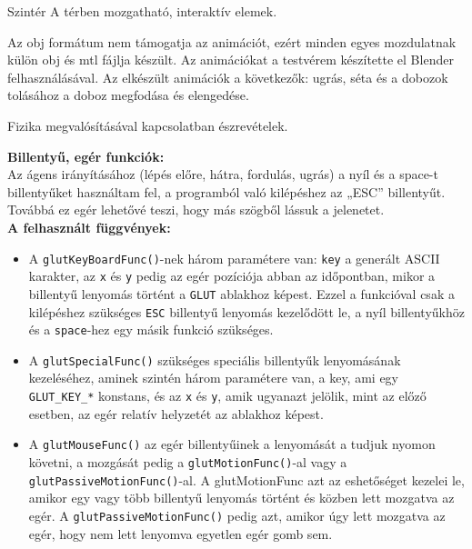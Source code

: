 
Szintér
A térben mozgatható, interaktív elemek.

Az obj formátum nem támogatja az animációt, ezért minden egyes mozdulatnak külön obj és mtl fájlja készült.
Az animációkat a testvérem készítette el Blender felhasználásával. Az elkészült animációk a következők:
ugrás, séta és a dobozok tolásához a doboz megfodása és elengedése.
 
Fizika megvalósításával kapcsolatban észrevételek.


{\bf Billentyű, egér funkciók:}\\

Az ágens irányításához (lépés előre, hátra, fordulás, ugrás) a nyíl és a space-t billentyűket használtam fel, a  programból való kilépéshez az „ESC” billentyűt. Továbbá ez egér lehetővé teszi, hogy más szögből lássuk a jelenetet.\\

{ \bf A felhasznált függvények:}

\begin{itemize}
\item A \texttt{glutKeyBoardFunc()}-nek három paramétere van: \texttt{key} a generált ASCII karakter, az \texttt{x} és \texttt{y} pedig az egér pozíciója abban az időpontban, mikor a billentyű lenyomás történt a \texttt{GLUT} ablakhoz képest. Ezzel a funkcióval csak a kilépéshez szükséges \texttt{ESC} billentyű lenyomás kezelődött le, a nyíl billentyűkhöz és a \texttt{space}-hez egy másik funkció szükséges.
\item A \texttt{glutSpecialFunc()} szükséges speciális billentyűk lenyomásának kezeléséhez,  
aminek szintén három paramétere van, a key, ami egy \texttt{GLUT\_KEY\_*} konstans, és az \texttt{x} és \texttt{y}, amik ugyanazt jelölik, mint az előző esetben, az egér relatív helyzetét az ablakhoz képest.
\item A \texttt{glutMouseFunc()} az egér billentyűinek a lenyomását a  tudjuk nyomon követni, a mozgását pedig a \texttt{glutMotionFunc()}-al vagy a \texttt{glutPassiveMotionFunc()}-al. A glutMotionFunc azt az eshetőséget kezelei le, amikor egy vagy több billentyű lenyomás történt és közben lett mozgatva az egér. A \texttt{glutPassiveMotionFunc()} pedig azt, amikor úgy lett mozgatva az egér, hogy nem lett lenyomva egyetlen egér gomb sem.  
\end{itemize}
